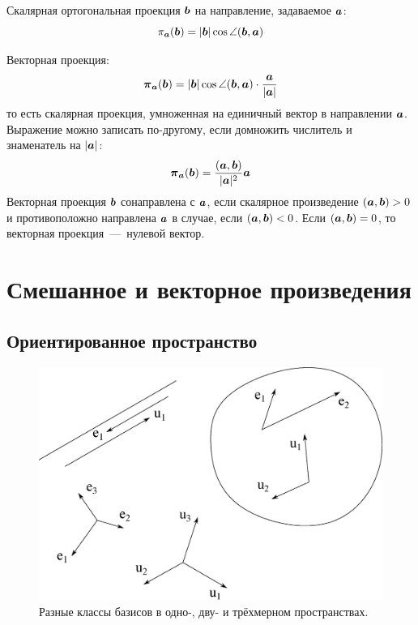 \documentclass[a4paper,12pt]{article}
\begin{document}
  \begin{solution}
    Скалярная ортогональная проекция $\boldsymbol b$ на направление, задаваемое $\boldsymbol a$:
    \[
      \pi_{\boldsymbol a}(\boldsymbol b) = |\boldsymbol b| \cos\angle(\boldsymbol b, \boldsymbol a)
    \]
    
    Векторная проекция:
    \[
      \boldsymbol \pi_{\boldsymbol a}(\boldsymbol b) = |\boldsymbol b| \cos\angle(\boldsymbol b, \boldsymbol a) \cdot \frac{\boldsymbol a}{|\boldsymbol a|}
    \]
    то есть скалярная проекция, умноженная на единичный вектор в направлении $\boldsymbol a$.
    Выражение можно записать по-другому, если домножить числитель и знаменатель на $|\boldsymbol a|$:
    \[
      \boldsymbol \pi_{\boldsymbol a}(\boldsymbol b) = \frac{(\boldsymbol a, \boldsymbol b)}{|\boldsymbol a|^2} \boldsymbol a
    \]
    Векторная проекция $\boldsymbol b$ сонаправлена с $\boldsymbol a$, если скалярное произведение $(\bds a, \bds b) \hm> 0$ и противоположно направлена $\boldsymbol a$ в случае, если $(\bds a, \bds b) \hm< 0$.
    Если $(\bds a, \bds b) \hm= 0$, то векторная проекция~---~нулевой вектор.
  \end{solution}


  \section{Смешанное и векторное произведения}
  
  \subsection{Ориентированное пространство}
  
  \begin{figure}[h]
    \centering
    
    \includegraphics[width=0.8\columnwidth]{two-classes}
    
    \caption{Разные классы базисов в одно-, дву- и трёхмерном пространствах.}
    \label{fig:two-classes}
  \end{figure}
  
\end{document}
